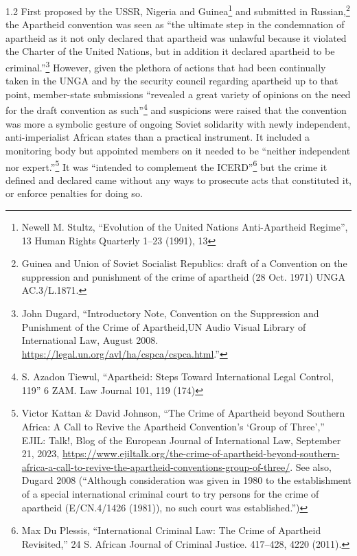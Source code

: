 \documentclass[../unravbook.tex]{subfiles}
\begin{document}
\begin{spacing}{1.2}
First proposed by the USSR, Nigeria and Guinea\footnote{Newell M. Stultz, \enquote{Evolution of the United Nations Anti-Apartheid Regime}, 13 Human Rights Quarterly  1--23 (1991), 13} and submitted in Russian,\footnote{Guinea and Union of Soviet Socialist Republics: draft of a Convention on the suppression and punishment of the crime of apartheid (28 Oct. 1971) UNGA AC.3/L.1871.} the Apartheid convention was seen as \enquote{the ultimate step in the condemnation of apartheid as it not only declared that apartheid was unlawful because it violated the Charter of the United Nations, but in addition it declared apartheid to be criminal.}\footnote{John Dugard, \enquote{Introductory Note, Convention on the Suppression and Punishment of the Crime of Apartheid,UN Audio Visual Library of International Law, August 2008. \url{https://legal.un.org/avl/ha/cspca/cspca.html}.}} However, given the plethora of actions that had been continually taken in the UNGA and by the security council regarding apartheid up to that point, member-state submissions  \enquote{revealed a great variety of opinions on the need for the draft convention as such}\footnote{S. Azadon Tiewul, \enquote{Apartheid: Steps Toward International Legal Control, 119} 6 ZAM. Law Journal 101, 119 (174)} and suspicions were raised that the convention was more a symbolic gesture of ongoing Soviet solidarity with newly independent, anti-imperialist African states than a practical instrument. It included a monitoring body but appointed members on it needed to be \enquote{neither independent nor expert.}\footnote{Victor Kattan \& David Johnson, \enquote{The Crime of Apartheid beyond Southern Africa: A Call to Revive the Apartheid Convention's \enquote{Group of Three},} EJIL: Talk!, Blog of the European Journal of International Law, September 21, 2023, \url{https://www.ejiltalk.org/the-crime-of-apartheid-beyond-southern-africa-a-call-to-revive-the-apartheid-conventions-group-of-three/}. See also, Dugard 2008 (``Although consideration was given in 1980 to the establishment of a special international criminal court to try persons for the crime of apartheid (E/CN.4/1426 (1981)), no such court was established.'')} It was \enquote{intended to complement the ICERD}\footnote{Max Du Plessis, \enquote{International Criminal Law: The Crime of Apartheid Revisited,} 24 S. African Journal of Criminal Justice. 417--428, 4220 (2011).} but the crime it defined and declared came without any ways to prosecute acts that constituted it, or enforce penalties for doing so.  


\end{spacing}
\end{document}
